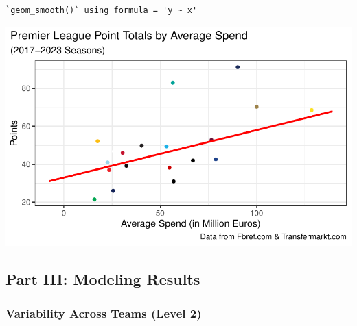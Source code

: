 \documentclass[
  letterpaper,
  DIV=11,
  numbers=noendperiod]{scrartcl}
\begin{document}
\begin{verbatim}
`geom_smooth()` using formula = 'y ~ x'
\end{verbatim}

\includegraphics{project_part_3_files/figure-pdf/spend-by-team-l2-1.pdf}

\subsection{Part III: Modeling Results}\label{part-iii-modeling-results}

\subsubsection{Variability Across Teams (Level
2)}\label{variability-across-teams-level-2}
\end{document}
